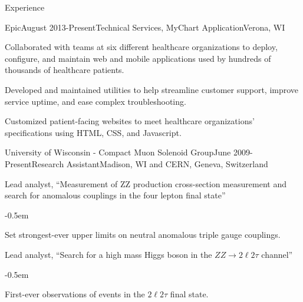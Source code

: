 \documentclass{resume} %
\begin{document}

\begin{rSection}{Experience}


\begin{rSubsection}{Epic}{August 2013-Present}{Technical Services, MyChart
Application}{Verona, WI}
\item Collaborated with teams at six different healthcare organizations to
deploy, configure, and maintain web and mobile applications used by
hundreds of thousands of healthcare patients.
\item Developed and maintained utilities to help streamline customer support,
improve service uptime, and ease complex troubleshooting.
\item Customized patient-facing websites to meet healthcare organizations'
specifications using HTML, CSS, and Javascript.  
\end{rSubsection}

\begin{rSubsection}{University of Wisconsin - Compact Muon Solenoid Group}{June
2009-Present}{Research Assistant}{Madison, WI and CERN, Geneva, Switzerland}

\item Lead analyst, ``Measurement of ZZ production cross-section measurement and
search for anomalous couplings in the four lepton final state''
    \begin{list}{}{\leftmargin=1.5em} 
      \itemsep -0.5em \vspace{-0.5em} %
      \item Set strongest-ever upper limits on neutral anomalous triple gauge
      couplings.
    \end{list}

\item Lead analyst, ``Search for a high mass Higgs boson in the $ZZ\rightarrow
2\ell2\tau$ channel''
    \begin{list}{}{\leftmargin=1.5em} 
      \itemsep -0.5em \vspace{-0.5em} %
      \item First-ever observations of events in the $2\ell2\tau$ final state.
    \end{list}


\end{rSubsection}
\end{rSection}
\end{document}
